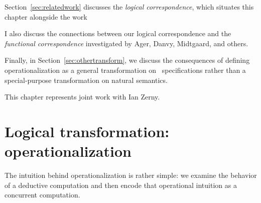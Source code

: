 Section~\ref{sec:relatedwork} discusses the {\it logical
  correspondence}, which situates this chapter alongside the work

I also discuss the connections between our logical
correspondence and the {\it functional correspondence} investigated by
Ager, Danvy, Midtgaard, and others.



Finally, in Section~\ref{sec:othertransform}, we discuss the
consequences of defining operationalization as a general
transformation on \sls~specifications rather than a special-purpose
transformation on natural semantics.

This chapter represents joint work with Ian Zerny.










\section{Logical transformation: operationalization}
\label{sec:operationalization}

The intuition behind operationalization is rather simple: we examine
the behavior of a deductive computation and then encode that
operational intuition as a concurrent computation. 

